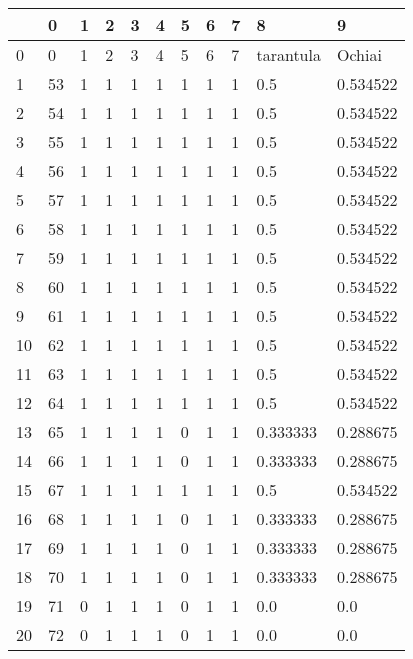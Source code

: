 \begin{tabular}{lllllllllll}
\toprule
{} &       0 &  1 &  2 &  3 &  4 &  5 &  6 &  7 &          8 &         9 \\
\midrule
0  &       0 &  1 &  2 &  3 &  4 &  5 &  6 &  7 &  tarantula &    Ochiai \\
1  &      53 &  1 &  1 &  1 &  1 &  1 &  1 &  1 &        0.5 &  0.534522 \\
2  &      54 &  1 &  1 &  1 &  1 &  1 &  1 &  1 &        0.5 &  0.534522 \\
3  &      55 &  1 &  1 &  1 &  1 &  1 &  1 &  1 &        0.5 &  0.534522 \\
4  &      56 &  1 &  1 &  1 &  1 &  1 &  1 &  1 &        0.5 &  0.534522 \\
5  &      57 &  1 &  1 &  1 &  1 &  1 &  1 &  1 &        0.5 &  0.534522 \\
6  &      58 &  1 &  1 &  1 &  1 &  1 &  1 &  1 &        0.5 &  0.534522 \\
7  &      59 &  1 &  1 &  1 &  1 &  1 &  1 &  1 &        0.5 &  0.534522 \\
8  &      60 &  1 &  1 &  1 &  1 &  1 &  1 &  1 &        0.5 &  0.534522 \\
9  &      61 &  1 &  1 &  1 &  1 &  1 &  1 &  1 &        0.5 &  0.534522 \\
10 &      62 &  1 &  1 &  1 &  1 &  1 &  1 &  1 &        0.5 &  0.534522 \\
11 &      63 &  1 &  1 &  1 &  1 &  1 &  1 &  1 &        0.5 &  0.534522 \\
12 &      64 &  1 &  1 &  1 &  1 &  1 &  1 &  1 &        0.5 &  0.534522 \\
13 &      65 &  1 &  1 &  1 &  1 &  0 &  1 &  1 &   0.333333 &  0.288675 \\
14 &      66 &  1 &  1 &  1 &  1 &  0 &  1 &  1 &   0.333333 &  0.288675 \\
15 &      67 &  1 &  1 &  1 &  1 &  1 &  1 &  1 &        0.5 &  0.534522 \\
16 &      68 &  1 &  1 &  1 &  1 &  0 &  1 &  1 &   0.333333 &  0.288675 \\
17 &      69 &  1 &  1 &  1 &  1 &  0 &  1 &  1 &   0.333333 &  0.288675 \\
18 &      70 &  1 &  1 &  1 &  1 &  0 &  1 &  1 &   0.333333 &  0.288675 \\
19 &      71 &  0 &  1 &  1 &  1 &  0 &  1 &  1 &        0.0 &       0.0 \\
20 &      72 &  0 &  1 &  1 &  1 &  0 &  1 &  1 &        0.0 &       0.0 \\

\end{tabular}
